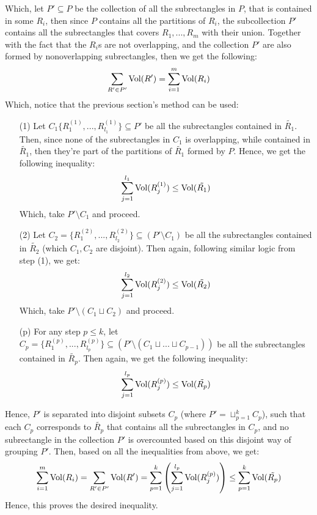 \documentclass{article}
\begin{document}
Which, let $P'\subseteq P$ be the collection of all the subrectangles in $P$, that is contained in some $R_i$, then since $P$ contains all the partitions of $R_i$, the subcollection $P'$ contains all the subrectangles that covers $R_1,...,R_m$ with their union. Together with the fact that the $R_i$s are not overlapping, and the collection $P'$ are also formed by nonoverlapping subrectangles, then we get the following:
\begin{equation}
    \sum_{R'\in P'}\textmd{Vol}(R') = \sum_{i=1}^{m}\textmd{Vol}(R_i)
\end{equation}
Which, notice that the previous section's method can be used:
\begin{itemize}
    \item[(1)] Let $C_1\{R_1^{(1)},...,R_{l_1}^{(1)}\}\subseteq P'$ be all the subrectangles contained in $\tilde{R_1}$. Then, since none of the subrectangles in $C_1$ is overlapping, while contained in $\tilde{R_1}$, then they're part of the partitions of $\tilde{R_1}$ formed by $P$. Hence, we get the following inequality:
    \begin{equation}
        \sum_{j=1}^{l_1}\textmd{Vol}(R_j^{(1)})\leq\textmd{Vol}(\tilde{R_1})
    \end{equation}
    Which, take $P'\setminus C_1$ and proceed.
    \item[(2)] Let $C_2=\{R_1^{(2)},...,R_{l_2}^{(2)}\}\subseteq (P'\setminus C_1)$ be all the subrectangles contained in $\tilde{R_2}$ (which $C_1,C_2$ are disjoint). Then again, following similar logic from step (1), we get:
    \begin{equation}
        \sum_{j=1}^{l_2}\textmd{Vol}(R_j^{(2)})\leq \textmd{Vol}(\tilde{R_2})
    \end{equation}
    Which, take $P'\setminus (C_1\sqcup C_2)$ and proceed.
    \item[(p)] For any step $p\leq k$, let $C_p = \{R_1^{(p)},...,R_{l_p}^{(p)}\}\subseteq (P'\setminus (C_1\sqcup ... \sqcup C_{p-1} ))$ be all the subrectangles contained in $\tilde{R_p}$. Then again, we get the following inequality:
    \begin{equation}
        \sum_{j=1}^{l_p}\textmd{Vol}(R_j^{(p)})\leq \textmd{Vol}(\tilde{R_p})
    \end{equation}
\end{itemize}
Hence, $P'$ is separated into disjoint subsets $C_p$ (where $P'=\sqcup_{p=1}^{k}C_p$), such that each $C_p$ corresponds to $\tilde{R_p}$ that contains all the subrectangles in $C_p$, and no subrectangle in the collection $P'$ is overcounted based on this disjoint way of grouping $P'$. Then, based on all the inequalities from above, we get:
\begin{equation}
    \sum_{i=1}^{m}\textmd{Vol}(R_i)=\sum_{R'\in P'}\textmd{Vol}(R') = \sum_{p=1}^{k}\left(\sum_{j=1}^{l_p}\textmd{Vol}(R_j^{(p)})\right)\leq \sum_{p=1}^{k}\textmd{Vol}(\tilde{R_p})
\end{equation}
Hence, this proves the desired inequality.
\end{document}
